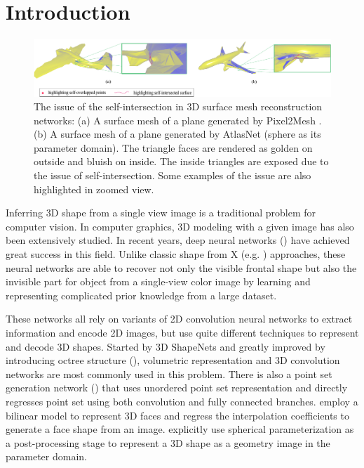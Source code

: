 \section{Introduction}
\begin{figure}[htbp]
	\centering
	\includegraphics[width=\linewidth]{img/issue/issue}
	\caption{The issue of the self-intersection in 3D surface mesh reconstruction networks: (a) A surface mesh of a plane generated by Pixel2Mesh \cite{pixel2mesh}. (b) A surface mesh of a plane generated by AtlasNet \cite{atlasnet}(sphere as its parameter domain). The triangle faces are rendered as golden on outside and bluish on inside. The inside triangles are exposed due to the issue of self-intersection. Some examples of the issue are also highlighted in zoomed view.}
	\label{fig:issue}
\end{figure}
Inferring 3D shape from a single view image is a traditional problem for computer vision. In computer graphics, 3D modeling with a given image has also been extensively studied. In recent years, deep neural networks (\cite{3DR2N2,PSGN,3Drender,imgrecon15,3dshapenet,endface,octreegen,surfnet,shapeprior}) have achieved great success in this field. Unlike classic shape from X (e.g. \cite{shapefromshading,shapefromtext1,shapefromtext2}) approaches, these neural networks are able to recover not only the visible frontal shape but also the invisible part for object from a single-view color image by learning and representing complicated prior knowledge from a large dataset. 

These networks all rely on variants of 2D convolution neural networks to extract information and encode 2D images, but use quite different techniques to represent and decode 3D shapes. Started by 3D ShapeNets \cite{3dshapenet} and greatly improved by introducing octree structure (\cite{octreegen}), volumetric representation and 3D convolution networks are most commonly used in this problem. There is also a point set generation network (\cite{PSGN}) that uses unordered point set representation and directly regresses point set using both convolution and fully connected branches. \cite{endface} employ a bilinear model to represent 3D faces and regress the interpolation coefficients to generate a face shape from an image. \cite{surfnet} explicitly use spherical parameterization as a post-processing stage to represent a 3D shape as a geometry image in the parameter domain. 

